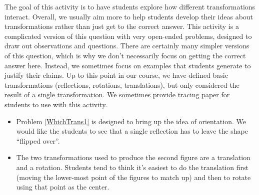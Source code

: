 \documentclass{ximera}
\begin{document}
\newpage
\begin{instructorNotes}

The goal of this activity is to have students explore how different transformations interact.  Overall, we usually aim more to help students develop their ideas about transformations rather than just get to the correct answer.  This activity is a complicated version of this question with very open-ended problems, designed to draw out observations and questions.  There are certainly many simpler versions of this question, which is why we don't necessarily focus on getting the correct answer here.  Instead, we sometimes focus on examples that students generate to justify their claims.  Up to this point in our course, we have defined basic transformations (reflections, rotations, translations), but only considered the result of a single transformation.  We sometimes provide tracing paper for students to use with this activity.


\begin{itemize}
    \item Problem \ref{WhichTrans1} is designed to bring up the idea of orientation.  We would like the students to see that a single reflection has to leave the shape ``flipped over''.  
    \item The two transformations used to produce the second figure are a translation and a rotation.  Students tend to think it's easiest to do the translation first (moving the lower-most point of the figures to match up) and then to rotate using that point as the center.
\end{itemize}



\end{instructorNotes}
\end{document}

